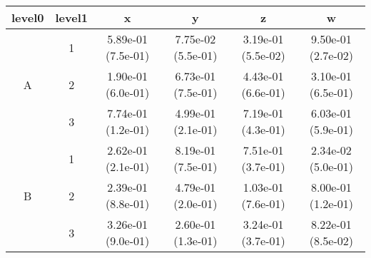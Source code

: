 \begin{tabular}{cccccc}
\toprule
level0 & level1&x&y&z&w\tabularnewline
\midrule
\multirow{3}{*}{A}&1& 5.89e-01 (7.5e-01)& 7.75e-02 (5.5e-01)& 3.19e-01 (5.5e-02)& 9.50e-01 (2.7e-02)\tabularnewline
&2& 1.90e-01 (6.0e-01)& 6.73e-01 (7.5e-01)& 4.43e-01 (6.6e-01)& 3.10e-01 (6.5e-01)\tabularnewline
&3& 7.74e-01 (1.2e-01)& 4.99e-01 (2.1e-01)& 7.19e-01 (4.3e-01)& 6.03e-01 (5.9e-01)\tabularnewline
\midrule
\multirow{3}{*}{B}&1& 2.62e-01 (2.1e-01)& 8.19e-01 (7.5e-01)& 7.51e-01 (3.7e-01)& 2.34e-02 (5.0e-01)\tabularnewline
&2& 2.39e-01 (8.8e-01)& 4.79e-01 (2.0e-01)& 1.03e-01 (7.6e-01)& 8.00e-01 (1.2e-01)\tabularnewline
&3& 3.26e-01 (9.0e-01)& 2.60e-01 (1.3e-01)& 3.24e-01 (3.7e-01)& 8.22e-01 (8.5e-02)\tabularnewline
\bottomrule
\end{tabular}
